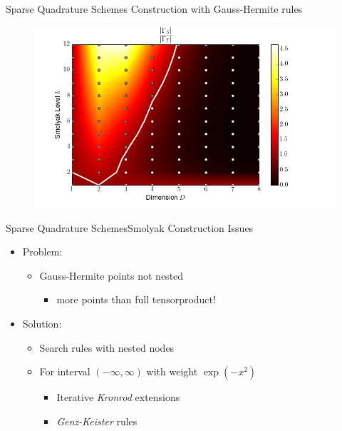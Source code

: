 \documentclass{beamer}
\newcommand{\cemph}[1]{\emph{\color{orange} #1}}
\begin{document}
\begin{frame}{Sparse Quadrature Schemes}
  Construction with Gauss-Hermite rules
  \begin{figure}
    \centering
    \includegraphics[width=0.8\linewidth]{./fig/smolyak_gauss_ratiomap.png}
  \end{figure}
\end{frame}


\begin{frame}{Sparse Quadrature Schemes}{Smolyak Construction Issues}
  \begin{itemize}
    \item Problem:
    \begin{itemize}
      \item Gauss-Hermite points not nested
      \begin{itemize}
        \item more points than full tensorproduct!
      \end{itemize}
    \end{itemize}
    \vspace{0.5cm}
    \item Solution:
    \begin{itemize}
      \item Search rules with nested nodes
      \item For interval $(-\infty, \infty)$ with weight $\exp(-x^2)$
      \begin{itemize}
        \item Iterative \cemph{Kronrod} extensions
        \item \cemph{Genz-Keister} rules
      \end{itemize}
    \end{itemize}
  \end{itemize}
\end{frame}
\end{document}
